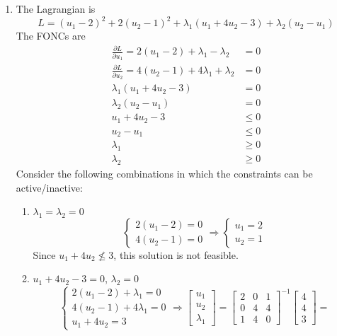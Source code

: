 \documentclass[letterpaper,12pt,titlepage]{article}
\newcommand*\pder[2]{\frac{\partial #1}{\partial #2}}
\begin{document}
\begin{enumerate}[leftmargin=0pt]
\item The Lagrangian is
  \[ L = (u_1-2)^2 + 2(u_2-1)^2 + \lambda_1(u_1+4u_2-3) + \lambda_2(u_2-u_1) \]
  The FONCs are
  \begin{align}
    \pder{L}{u_1} = 2(u_1-2) + \lambda_1 - \lambda_2 &= 0 \\
    \pder{L}{u_2} = 4(u_2-1) + 4\lambda_1 + \lambda_2 &= 0\\
    \lambda_1(u_1+4u_2-3) &= 0 \\
    \lambda_2(u_2-u_1) &= 0 \\
    u_1+4u_2-3 &\le 0 \\
    u_2-u_1 &\le 0 \\
    \lambda_1 &\ge 0 \\
    \lambda_2 &\ge 0
  \end{align}
  Consider the following combinations in which the constraints can be active/inactive:
  \begin{enumerate}
  \item $\lambda_1=\lambda_2=0$
    \[ \begin{cases}
        2(u_1-2) = 0 \\
        4(u_2-1) = 0
      \end{cases} \Longrightarrow
      \begin{cases}
        u_1 = 2 \\
        u_2 = 1
      \end{cases} \]
    Since $u_1+4u_2 \nleq 3$, this solution is not feasible.
  \item $u_1+4u_2-3 = 0$, $\lambda_2=0$
    \[ \begin{cases}
        2(u_1-2) + \lambda_1 = 0 \\
        4(u_2-1) + 4\lambda_1 = 0 \\
        u_1 + 4u_2 = 3
      \end{cases} \Longrightarrow
      \begin{bmatrix} u_1 \\ u_2 \\ \lambda_1 \end{bmatrix} =
      \begin{bmatrix}
        2 & 0 & 1 \\
        0 & 4 & 4 \\
        1 & 4 & 0
      \end{bmatrix}^{-1}
      \begin{bmatrix}
        4 \\ 4 \\ 3
      \end{bmatrix} =
\]
\end{enumerate}
\end{enumerate}
\end{document}
